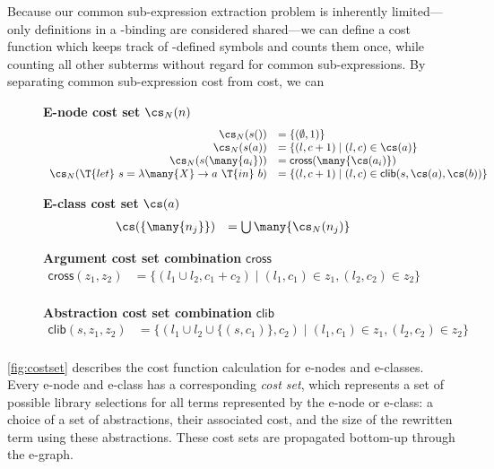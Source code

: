 Because our common sub-expression extraction problem is
inherently limited---only definitions in a -binding are
considered shared---we can define a cost function which keeps track
of -defined symbols and counts them once, while counting all
other subterms without regard for common sub-expressions.
%
By separating common sub-expression cost from 
cost, we can 

\begin{figure}
  \textbf{E-node cost set} $\cs_N(n)$
  $$
  \begin{array}{rl}
    \cs_N(s()) &= \{ (\emptyset, 1) \} \\
    \cs_N(s(a)) &= \{ (l, c + 1) \mid (l, c) \in \cs(a) \} \\
    \cs_N(s(\many{a_i})) &= \mathsf{cross}(\many{\cs(a_i)}) \\
    \cs_N(\T{let}\ s = \lambda \many{X} \to a\ \T{in}\ b) &= \{ (l, c + 1) \mid (l, c) \in \mathsf{clib}(s, \cs(a), \cs(b)) \} \\
    \end{array}
  $$

  \textbf{E-class cost set} $\cs(a)$
  $$
  \begin{array}{rl}
    \cs(\{ \many{n_j} \}) &= \bigcup \many{\cs_N(n_j)} \\
  \end{array}
  $$

  \textbf{Argument cost set combination} $\mathsf{cross}$
  $$
  \begin{array}{rl}
    \mathsf{cross}(z_1, z_2) &= \{ (l_1 \cup l_2, c_1 + c_2) \mid (l_1, c_1) \in z_1, (l_2, c_2) \in z_2 \} \\
  \end{array}
  $$

  \textbf{Abstraction cost set combination} $\mathsf{clib}$
  $$
  \begin{array}{rl}
    \mathsf{clib}(s, z_1, z_2) &= \{ (l_1 \cup l_2 \cup \{ (s, c_1) \}, c_2) \mid (l_1, c_1) \in z_1, (l_2, c_2) \in z_2 \} \\
  \end{array}
  $$
\caption{}\label{fig:costset}
\end{figure}

\autoref{fig:costset} describes the cost function calculation for
e-nodes and e-classes.
%
Every e-node and e-class has a corresponding \emph{cost set},
which represents a set of possible library selections for all terms
represented by the e-node or e-class:
a choice of a set of abstractions, their associated cost, and the
size of the rewritten term using these abstractions.
%
These cost sets are propagated bottom-up through the e-graph.

